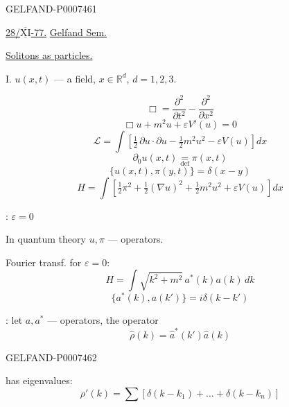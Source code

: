 \begin{GelfandAdjacentEvidence}{GELFAND-P000746}{1}

\underline{28/\(\overline{\underline{\mathrm{XI}}}\)-77.}\qquad
\underline{Gelfand Sem.}

\qquad
\underline{Solitons as particles.}

I. \(u(x,t)\) --- a field, \(x\in\mathbb R^d\), \(d=1,2,3\).

\[
\Box=\frac{\partial^2}{\partial t^2}-\frac{\partial^2}{\partial x^2}
\]
\begin{equation*}
\Box u+m^2u+\varepsilon V'(u)=0
\tag{1}
\end{equation*}
\begin{equation*}
\mathcal L=\int\left[\tfrac12\,\partial u\cdot\partial u
-\tfrac12 m^2u^2-\varepsilon V(u)\right]dx
\tag{2}
\end{equation*}
\[
\partial_0u(x,t)\underset{\mathrm{def}}{=}\pi(x,t)
\]
\begin{equation*}
\{u(x,t),\pi(y,t)\}=\delta(x-y)
\tag{3}
\end{equation*}
\begin{equation*}
H=\int\left[\tfrac12\pi^2+\tfrac12(\nabla u)^2
+\tfrac12m^2u^2+\varepsilon V(u)\right]dx
\tag{4}
\end{equation*}

: \(\varepsilon=0\)

In quantum theory \(u,\pi\) --- operators.

Fourier transf. for \(\varepsilon=0\):
\begin{equation*}
H=\int\sqrt{k^2+m^2}\,a^*(k)a(k)\,dk
\tag{5}
\end{equation*}
\begin{equation*}
\{a^*(k),a(k')\}=i\delta(k-k')
\tag{6}
\end{equation*}

: let \(a,a^*\) --- operators, the operator
\begin{equation*}
\hat\rho(k)=\hat a^*(k')\hat a(k)
\tag{7}
\end{equation*}
\end{GelfandAdjacentEvidence}
\begin{GelfandAdjacentEvidence}{GELFAND-P000746}{2}


has eigenvalues:
\begin{equation*}
\rho'(k)=\sum\left[\delta(k-k_1)+\dots+\delta(k-k_n)\right]
\tag{8}
\end{equation*}
\end{GelfandAdjacentEvidence}


